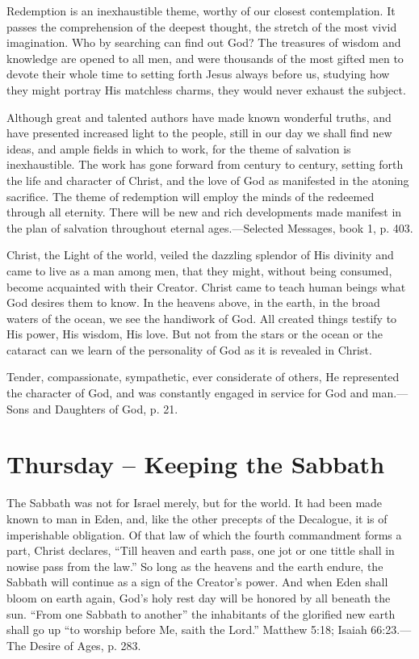 \documentclass[a4paper, 10pt, twoside, headings=small]{scrartcl}
\begin{document}
\begin{multicols}{2}
Redemption is an inexhaustible theme, worthy of our closest contemplation. It passes the comprehension of the deepest thought, the stretch of the most vivid imagination. Who by searching can find out God? The treasures of wisdom and knowledge are opened to all men, and were thousands of the most gifted men to devote their whole time to setting forth Jesus always before us, studying how they might portray His matchless charms, they would never exhaust the subject.

Although great and talented authors have made known wonderful truths, and have presented increased light to the people, still in our day we shall find new ideas, and ample fields in which to work, for the theme of salvation is inexhaustible. The work has gone forward from century to century, setting forth the life and character of Christ, and the love of God as manifested in the atoning sacrifice. The theme of redemption will employ the minds of the redeemed through all eternity. There will be new and rich developments made manifest in the plan of salvation throughout eternal ages.—Selected Messages, book 1, p. 403.

Christ, the Light of the world, veiled the dazzling splendor of His divinity and came to live as a man among men, that they might, without being consumed, become acquainted with their Creator. Christ came to teach human beings what God desires them to know. In the heavens above, in the earth, in the broad waters of the ocean, we see the handiwork of God. All created things testify to His power, His wisdom, His love. But not from the stars or the ocean or the cataract can we learn of the personality of God as it is revealed in Christ.

Tender, compassionate, sympathetic, ever considerate of others, He represented the character of God, and was constantly engaged in service for God and man.—Sons and Daughters of God, p. 21.

\section*{Thursday – Keeping the Sabbath}

The Sabbath was not for Israel merely, but for the world. It had been made known to man in Eden, and, like the other precepts of the Decalogue, it is of imperishable obligation. Of that law of which the fourth commandment forms a part, Christ declares, “Till heaven and earth pass, one jot or one tittle shall in nowise pass from the law.” So long as the heavens and the earth endure, the Sabbath will continue as a sign of the Creator’s power. And when Eden shall bloom on earth again, God’s holy rest day will be honored by all beneath the sun. “From one Sabbath to another” the inhabitants of the glorified new earth shall go up “to worship before Me, saith the Lord.” Matthew 5:18; Isaiah 66:23.—The Desire of Ages, p. 283.


\end{multicols}
\end{document}
